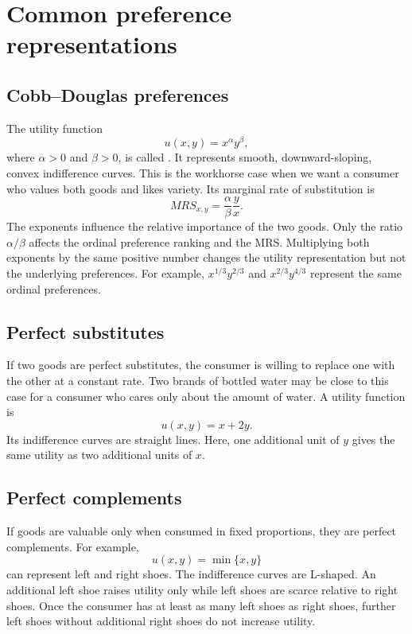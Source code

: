 \section{Common preference representations}

\subsection{Cobb--Douglas preferences}

The utility function
\[
u(x,y)=x^\alpha y^\beta,
\]
where $\alpha>0$ and $\beta>0$, is called . It
represents smooth, downward-sloping, convex indifference curves. This is the
workhorse case when we want a consumer who values both goods and likes
variety. Its marginal rate of substitution is
\[
MRS_{x,y}=\frac{\alpha}{\beta}\frac{y}{x}.
\]
The exponents influence the relative importance of the two goods. Only the
ratio $\alpha/\beta$ affects the ordinal preference ranking and the MRS.
Multiplying both exponents by the same positive number changes the utility
representation but not the underlying preferences. For example,
$x^{1/3}y^{2/3}$ and $x^{2/3}y^{4/3}$ represent the same ordinal
preferences.

\subsection{Perfect substitutes}

If two goods are perfect substitutes, the consumer is willing to replace one
with the other at a constant rate. Two brands of bottled water may be close
to this case for a consumer who cares only about the amount of water. A
utility function is
\[
u(x,y)=x+2y.
\]
Its indifference curves are straight lines. Here, one additional unit of $y$ gives the same utility as two additional units of $x$.

\subsection{Perfect complements}

If goods are valuable only when consumed in fixed proportions, they are
perfect complements. For example,
\[
u(x,y)=\min\{x,y\}
\]
can represent left and right shoes. The indifference curves are L-shaped. An
additional left shoe raises utility only while left shoes are scarce relative
to right shoes. Once the consumer has at least as many left shoes as right
shoes, further left shoes without additional right shoes do not increase
utility.

